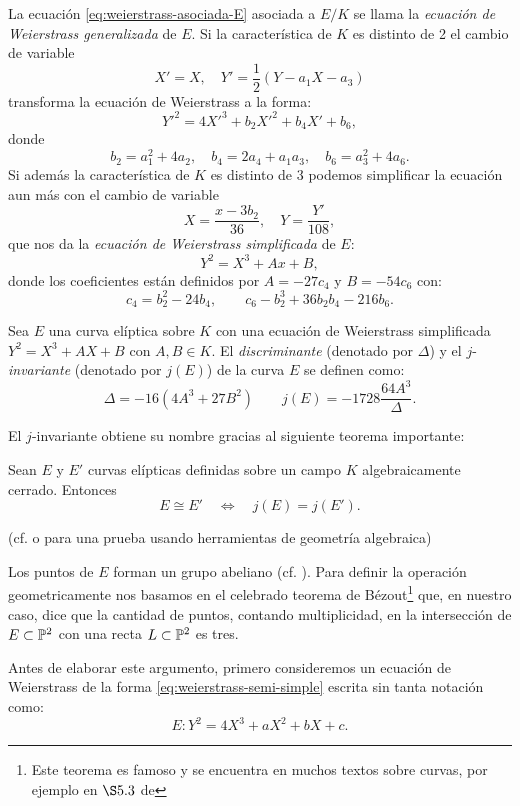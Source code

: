 La ecuación \ref{eq:weierstrass-asociada-E} asociada a $E/K$ se llama la \emph{ecuación de Weierstrass generalizada} de $E$. Si la característica de $K$ es distinto de 2 el cambio de variable
\[
	X'=X,\quad Y'=\frac{1}{2}(Y-a_1X-a_3)
\]
transforma la ecuación de Weierstrass a la forma:
\begin{equation}\label{eq:weierstrass-semi-simple}
  Y'^2=4X'^3+b_2X'^2+b_4X'+b_6,
\end{equation}
donde
\[
	b_2=a_1^2+4a_2,\quad b_4=2a_4+a_1a_3,\quad b_6=a_3^2+4a_6.
\]
Si además la característica de $K$ es distinto de 3 podemos simplificar la ecuación aun más con el cambio de variable
\[
	X=\frac{x-3b_2}{36},\quad Y=\frac{Y'}{108},
\]
que nos da la \emph{ecuación de Weierstrass simplificada} de $E$:
\[
	Y^2=X^3+Ax+B,
\]
donde los coeficientes están definidos por $A=-27c_4$ y $B=-54c_6$ con:
\[
	c_4=b_2^2-24b_4,\qquad c_6-b_2^3+36b_2b_4-216b_6.
\]
\begin{defin}
  Sea $E$ una curva el\'iptica sobre $K$ con una ecuación de Weierstrass simplificada $Y^2=X^3+AX+B$ con $A,B\in K$. El \emph{discriminante} (denotado por $\Delta$) y el $j$-\emph{invariante} (denotado por $j(E)$) de la curva $E$ se definen como:
  \[
    \Delta=-16(4A^3+27B^2) \qquad j(E)=-1728\frac{64 A^3}{\Delta}.
  \]
\end{defin}

El $j$-invariante obtiene su nombre gracias al siguiente teorema importante:

\begin{thm}\label{thm:clasificar-j-invariante}
  Sean $E$ y $E'$ curvas el\'ipticas definidas sobre un campo $K$ algebraicamente cerrado.
  Entonces
  \[
    E\cong E' \quad \iff \quad j(E)=j(E'). 
  \]  
\end{thm}
\noindent (cf. \cite[\S3.1, proposici\'on 1.4]{SilvermanTAOEC} o
\cite[cap\'itulo IV, teorema 4.1]{HartshorneAG} para una prueba usando herramientas de geometr\'ia
algebraica)

Los puntos de $E$ forman un grupo abeliano (cf. \cite[\S3.2]{SilvermanTAOEC}). Para definir la operación geometricamente nos basamos en el celebrado teorema de Bézout\footnote{Este teorema es famoso y se encuentra en muchos textos sobre curvas, por ejemplo en $\S 5.3$ de\cite{FultonAC}} que, en nuestro caso, dice que la cantidad de puntos, contando multiplicidad, en la intersección de $E\subset\mathbb{P}^2$ con una recta $L\subset\mathbb{P}^2$ es tres.

Antes de elaborar este argumento, primero consideremos un ecuación de Weierstrass de la forma \ref{eq:weierstrass-semi-simple} escrita sin tanta notación como:
\begin{equation}\label{eq:weierstrass-ss}
	E: Y^2=4X^3+aX^2+bX+c.
\end{equation}
	
